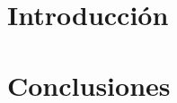 \documentclass[a4paper, 10pt, twoside]{article}
\begin{document}
\newpage

\tableofcontents

\newpage



\section{Introducción}

\newpage


\section{Conclusiones}
\end{document}
